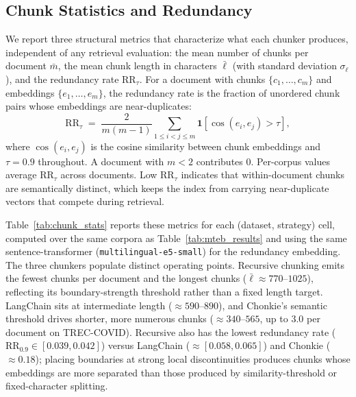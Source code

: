 \subsection{Chunk Statistics and Redundancy}
\label{sec:chunk_stats}
We report three structural metrics that characterize what each chunker produces, independent of any retrieval evaluation: the mean number of chunks per document $\bar{m}$, the mean chunk length in characters $\bar{\ell}$ (with standard deviation $\sigma_\ell$), and the redundancy rate $\mathrm{RR}_\tau$. For a document with chunks $\{c_1, \dots, c_m\}$ and embeddings $\{e_1, \dots, e_m\}$, the redundancy rate is the fraction of unordered chunk pairs whose embeddings are near-duplicates:
\begin{equation}
\mathrm{RR}_\tau \;=\; \frac{2}{m(m-1)} \sum_{1 \le i < j \le m} \mathbf{1}\!\left[\cos(e_i, e_j) > \tau\right],
\label{eq:redundancy}
\end{equation}
where $\cos(e_i,e_j)$ is the cosine similarity between chunk embeddings and $\tau{=}0.9$ throughout. A document with $m{<}2$ contributes $0$. Per-corpus values average $\mathrm{RR}_\tau$ across documents. Low $\mathrm{RR}_\tau$ indicates that within-document chunks are semantically distinct, which keeps the index from carrying near-duplicate vectors that compete during retrieval.

Table~\ref{tab:chunk_stats} reports these metrics for each (dataset, strategy) cell, computed over the same corpora as Table~\ref{tab:mteb_results} and using the same sentence-transformer (\texttt{multilingual-e5-small}) for the redundancy embedding. The three chunkers populate distinct operating points. Recursive chunking emits the fewest chunks per document and the longest chunks ($\bar\ell \approx 770$--$1025$), reflecting its boundary-strength threshold rather than a fixed length target. LangChain sits at intermediate length ($\approx 590$--$890$), and Chonkie's semantic threshold drives shorter, more numerous chunks ($\approx 340$--$565$, up to $3.0$ per document on TREC-COVID). Recursive also has the lowest redundancy rate ($\mathrm{RR}_{0.9} \in [0.039, 0.042]$) versus LangChain ($\approx [0.058, 0.065]$) and Chonkie ($\approx 0.18$); placing boundaries at strong local discontinuities produces chunks whose embeddings are more separated than those produced by similarity-threshold or fixed-character splitting.

